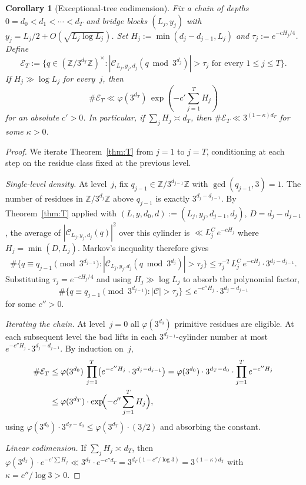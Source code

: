 \documentclass[11pt,a4paper]{amsart}
\theoremstyle{plain}
\newtheorem{corollary}[theorem]{Corollary}
\theoremstyle{definition}
\newcommand{\Z}{\mathbb{Z}}
\begin{document}
\begin{corollary}[Exceptional-tree codimension]\label{cor:tree}
Fix a chain of depths $0=d_0<d_1<\cdots<d_T$ and bridge blocks
$(L_j,y_j)$ with $y_j=L_j/2+O(\sqrt{L_j\log L_j})$.
Set $H_j:=\min(d_j-d_{j-1},L_j)$ and $\tau_j:=e^{-cH_j/4}$.
Define
$$
\mathcal E_T:=\bigl\{q\in(\Z/3^{d_T}\Z)^\times:
|\mathcal C_{L_j,y_j,d_j}(q\bmod 3^{d_j})|>\tau_j\text{ for every }1\le j\le T\bigr\}.
$$
If $H_j\gg\log L_j$ for every~$j$, then
\begin{equation}\label{eq:treebound}
\#\mathcal E_T\ll\varphi(3^{d_T})\,\exp\!\left(-c'\sum_{j=1}^T H_j\right)
\end{equation}
for an absolute $c'>0$.
In particular, if $\sum_j H_j\asymp d_T$, then $\#\mathcal E_T\ll 3^{(1-\kappa)d_T}$
for some $\kappa>0$.
\end{corollary}

\begin{proof}
We iterate Theorem~\ref{thm:T} from $j=1$ to $j=T$, conditioning at each
step on the residue class fixed at the previous level.

\emph{Single-level density.}
At level~$j$, fix $q_{j-1}\in\Z/3^{d_{j-1}}\Z$ with $\gcd(q_{j-1},3)=1$.
The number of residues in $\Z/3^{d_j}\Z$ above $q_{j-1}$ is exactly
$3^{d_j-d_{j-1}}$.
By Theorem~\ref{thm:T} applied with $(L,y,d_0,d):=(L_j,y_j,d_{j-1},d_j)$,
$D=d_j-d_{j-1}$, the average of $|\mathcal C_{L_j,y_j,d_j}(q)|^2$ over
this cylinder is $\ll L_j^C\,e^{-cH_j}$ where $H_j=\min(D,L_j)$.
Markov's inequality therefore gives
\begin{equation}\label{eq:singlelevel}
\#\bigl\{q\equiv q_{j-1}\!\!\pmod{3^{d_{j-1}}}:|\mathcal C_{L_j,y_j,d_j}(q\bmod 3^{d_j})|>\tau_j\bigr\}
\le \tau_j^{-2}\,L_j^C\,e^{-cH_j}\cdot 3^{d_j-d_{j-1}}.
\end{equation}
Substituting $\tau_j=e^{-cH_j/4}$ and using $H_j\gg\log L_j$ to absorb the
polynomial factor,
\begin{equation}\label{eq:singlelevel-tau}
\#\bigl\{q\equiv q_{j-1}\!\!\pmod{3^{d_{j-1}}}:|\mathcal C|>\tau_j\bigr\}
\le e^{-c''H_j}\cdot 3^{d_j-d_{j-1}}
\end{equation}
for some $c''>0$.

\emph{Iterating the chain.}
At level~$j=0$ all $\varphi(3^{d_0})$ primitive residues are eligible.
At each subsequent level the bad lifts in each
$3^{d_{j-1}}$-cylinder number at most $e^{-c''H_j}\cdot 3^{d_j-d_{j-1}}$.
By induction on~$j$,
\begin{align*}
\#\mathcal E_T
&\le \varphi(3^{d_0})\,\prod_{j=1}^T\bigl(e^{-c''H_j}\cdot 3^{d_j-d_{j-1}}\bigr)
=\varphi(3^{d_0})\cdot 3^{d_T-d_0}\cdot\prod_{j=1}^T e^{-c''H_j}\\
&\le\varphi(3^{d_T})\cdot\exp\!\Bigl(-c''\sum_{j=1}^T H_j\Bigr),
\end{align*}
using $\varphi(3^{d_0})\cdot 3^{d_T-d_0}\le\varphi(3^{d_T})\cdot(3/2)$ and absorbing
the constant.

\emph{Linear codimension.}
If $\sum_j H_j\asymp d_T$, then
$\varphi(3^{d_T})\cdot e^{-c'\sum H_j}\ll 3^{d_T}\cdot e^{-c''d_T}=3^{d_T(1-c''/\log 3)}=3^{(1-\kappa)d_T}$
with $\kappa=c''/\log 3>0$.
\end{proof}
\end{document}
